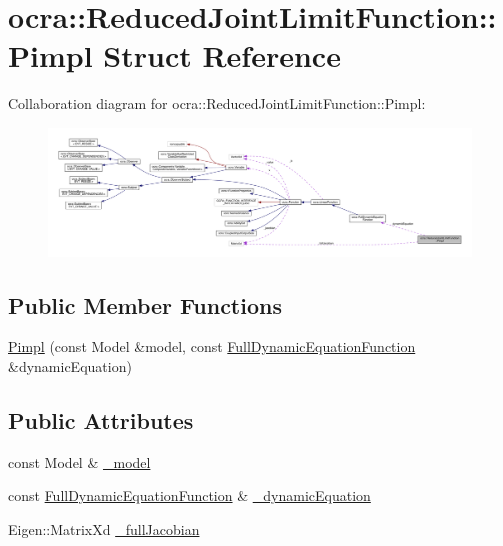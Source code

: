 \hypertarget{structReducedJointLimitFunction_1_1Pimpl}{}\section{ocra\+:\+:Reduced\+Joint\+Limit\+Function\+:\+:Pimpl Struct Reference}
\label{structReducedJointLimitFunction_1_1Pimpl}


Collaboration diagram for ocra\+:\+:Reduced\+Joint\+Limit\+Function\+:\+:Pimpl\+:\nopagebreak
\begin{figure}[H]
\begin{center}
\leavevmode
\includegraphics[width=350pt]{d0/d8b/structReducedJointLimitFunction_1_1Pimpl__coll__graph}
\end{center}
\end{figure}
\subsection*{Public Member Functions}
\begin{DoxyCompactItemize}
\item 
\hyperlink{structReducedJointLimitFunction_1_1Pimpl_a144b5331a7812ad5859215d57f8fd250}{Pimpl} (const Model \&model, const \hyperlink{classocra_1_1FullDynamicEquationFunction}{Full\+Dynamic\+Equation\+Function} \&dynamic\+Equation)
\end{DoxyCompactItemize}
\subsection*{Public Attributes}
\begin{DoxyCompactItemize}
\item 
const Model \& \hyperlink{structReducedJointLimitFunction_1_1Pimpl_abe6f625fec9bf8cff9f847bde9eb9ee2}{\+\_\+model}
\item 
const \hyperlink{classocra_1_1FullDynamicEquationFunction}{Full\+Dynamic\+Equation\+Function} \& \hyperlink{structReducedJointLimitFunction_1_1Pimpl_ad483380d3fcdd2da03a85d22947cf31d}{\+\_\+dynamic\+Equation}
\item 
Eigen\+::\+Matrix\+Xd \hyperlink{structReducedJointLimitFunction_1_1Pimpl_ae45e80b72fb13b54452c6ce9fe9e3798}{\+\_\+full\+Jacobian}
\end{DoxyCompactItemize}


